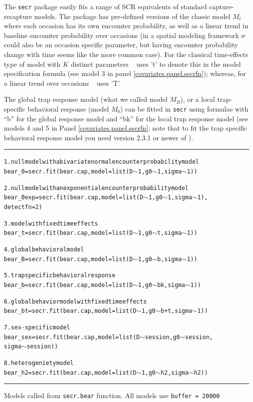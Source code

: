 The \mbox{\tt secr} package easily fits a range of SCR equivalents of
standard capture-recapture models.  The package has pre-defined
versions of the classic model $M_{t}$ where each occasion has its own
encounter probability, as well as a linear trend in baseline encounter
probability over occasions (in a spatial modeling framework $\sigma$
could also be an occasion specific parameter, but having encounter
probability change with time seems like the more common case). For the
classical time-effects type of model with $K$ distinct parameters
\secr~ uses 't' to denote this in the model specification formula (see
model 3 in panel \ref{covariates.panel.secrfn}); whereas, for a linear
trend over occasions \secr~ uses 'T'.

The global trap response model (what we called model $M_{B}$), or a
local trap-specific behavioral response (model $M_{b}$) can be fitted
in \mbox{\tt secr} using formulae with ``b'' for the global response
model and ``bk'' for the local trap response model (see models 4 and 5
in Panel \ref{covariates.panel.secrfn}; note that to fit the trap
specific behavioral response model you need version 2.3.1 or newer of
\secr).

\begin{panel}[htp]
\centering
\rule[0.1in]{\textwidth}{.03in}
{\small
\begin{alltt}
1. null model with a bivariate normal encounter probability  model
bear_0=secr.fit(bear.cap, model=list(D \(\sim\) 1, g0 \(\sim\) 1, sigma \(\sim\) 1))

2. null model with an exponential encounter probability model
bear_0exp=secr.fit(bear.cap, model=list(D \(\sim\) 1, g0 \(\sim\) 1, sigma \(\sim\) 1),
                   detectfn=2)

3. model with fixed time effects
bear_t=secr.fit(bear.cap, model=list(D \(\sim\) 1, g0 \(\sim\) t, sigma \(\sim\) 1))

4. global behavioral model
bear_B=secr.fit(bear.cap, model=list(D \(\sim\) 1, g0 \(\sim\) b, sigma \(\sim\) 1))

5. trap specific behavioral response
bear_b=secr.fit(bear.cap, model=list(D \(\sim\) 1, g0 \(\sim\) bk, sigma \(\sim\) 1))

6. global behavior model with fixed time effects
bear_bt=secr.fit(bear.cap, model=list(D \(\sim\) 1, g0 \(\sim\) b+t, sigma \(\sim\) 1))

7. sex-specific model
bear_sex=secr.fit(bear.cap, model=list(D \(\sim\) session, g0 \(\sim\) session, 
                  sigma \(\sim\) session))

8. heterogeniety model
bear_h2=secr.fit(bear.cap, model=list(D \(\sim\) 1, g0 \(\sim\) h2, sigma \(\sim\) h2))
\end{alltt}
}

\rule[-0.1in]{\textwidth}{.03in}
\caption{
Models called from \mbox{\tt secr.bear} function. All models use \mbox{\tt buffer = 20000}}
\label{covariates.panel.secrfn}
\end{panel}


